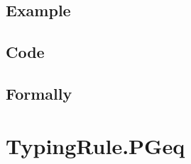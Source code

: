 \documentclass{book}
\begin{document}
  \subsection{Example}

  \subsection{Code}

\begin{emptyformal}
    \subsection{Formally}
\end{emptyformal}


\section{TypingRule.PGeq \label{sec:TypingRule.PGeq}}
\end{document}
